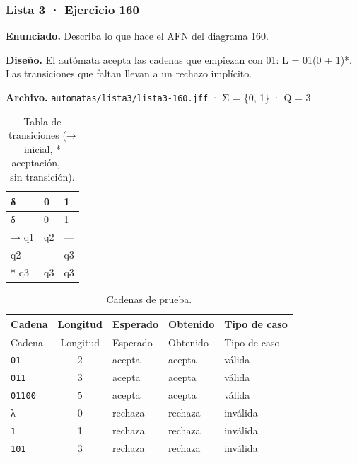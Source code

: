 
\hypertarget{lista-3-ejercicio-160}{%
\subsubsection{Lista 3 · Ejercicio 160}\label{lista-3-ejercicio-160}}

\textbf{Enunciado.} Describa lo que hace el AFN del diagrama 160.

\textbf{Diseño.} El autómata acepta las cadenas que empiezan con 01: L = 01(0 + 1)*. Las transiciones que faltan llevan a un rechazo implícito.

\textbf{Archivo.} \texttt{automatas/lista3/lista3-160.jff} · Σ = \{0, 1\} · \textbar Q\textbar{} = 3

\begin{longtable}[]{@{}lll@{}}
\caption{Tabla de transiciones (→ inicial, * aceptación, --- sin transición).}\tabularnewline
\toprule\noalign{}
δ & 0 & 1 \\
\midrule\noalign{}
\endfirsthead
\toprule\noalign{}
δ & 0 & 1 \\
\midrule\noalign{}
\endhead
\bottomrule\noalign{}
\endlastfoot
→ q1 & q2 & --- \\
q2 & --- & q3 \\
* q3 & q3 & q3 \\
\end{longtable}

\begin{longtable}[]{@{}lclll@{}}
\caption{Cadenas de prueba.}\tabularnewline
\toprule\noalign{}
Cadena & Longitud & Esperado & Obtenido & Tipo de caso \\
\midrule\noalign{}
\endfirsthead
\toprule\noalign{}
Cadena & Longitud & Esperado & Obtenido & Tipo de caso \\
\midrule\noalign{}
\endhead
\bottomrule\noalign{}
\endlastfoot
\texttt{01} & 2 & acepta & acepta & válida \\
\texttt{011} & 3 & acepta & acepta & válida \\
\texttt{01100} & 5 & acepta & acepta & válida \\
λ & 0 & rechaza & rechaza & inválida \\
\texttt{1} & 1 & rechaza & rechaza & inválida \\
\texttt{101} & 3 & rechaza & rechaza & inválida \\
\end{longtable}

